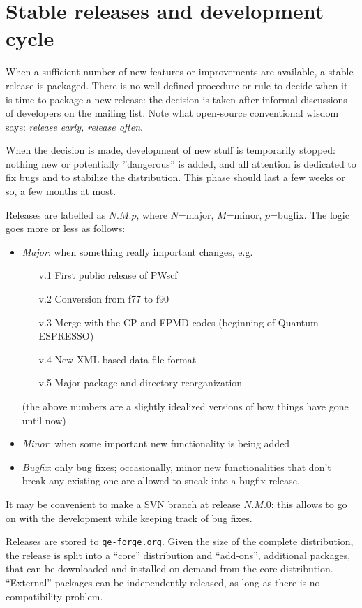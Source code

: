 \documentclass[12pt,a4paper]{article}
\def\qe{{\sc Quantum ESPRESSO}}
\def\qeforge{\texttt{qe-forge.org}}
\begin{document}
\section{Stable releases and development cycle}
When a sufficient number of new features or improvements are available,
a stable release is packaged. There is no well-defined procedure or 
rule to decide when it is time to package a new release: the decision
is taken after informal discussions of developers on the mailing list. 
Note what open-source conventional wisdom says: 
{\em release early, release often}.

When the decision is made, development of new stuff is temporarily
stopped: nothing new or potentially ''dangerous'' is added, and all 
attention is dedicated to fix bugs and to stabilize the distribution.
This phase should last a few weeks or so, a few months at most.

Releases are labelled as $N.M.p$, where $N$=major, $M$=minor, $p$=bugfix.
The logic goes more or less as follows:
\begin{itemize}
\item {\em Major}: when something really important changes, e.g.
\begin{enumerate}
\item[v.1] First public release of PWscf
\item[v.2] Conversion from f77 to f90
\item[v.3] Merge with the CP and FPMD codes (beginning of \qe)
\item[v.4] New XML-based data file format
\item[v.5] Major package and directory reorganization
\end{enumerate}
(the above numbers are a slightly idealized versions of how things have 
gone until now)
\item {\em Minor}: when some important new functionality is being added
\item {\em Bugfix}: only bug fixes; occasionally, minor new functionalities
that don't break any existing one are allowed to sneak into a bugfix release.
\end{itemize}
It may be convenient to make a SVN branch at release $N.M.0$: this allows 
to go on with the development while keeping track of bug fixes. 

Releases are stored to \qeforge. Given the size of the complete distribution,
the release is split into a ``core'' distribution and ``add-ons'',
additional packages, that can be downloaded and installed on demand 
from the core distribution. ``External'' packages can be independently
released, as long as there is no compatibility problem.
\end{document}
